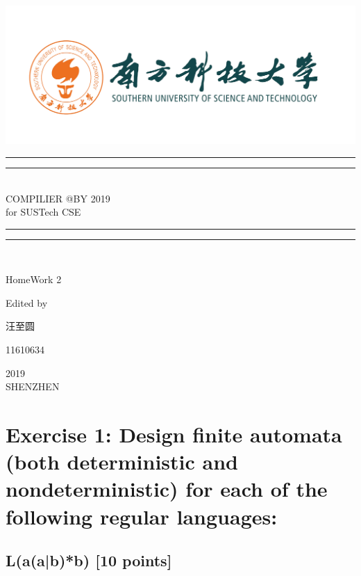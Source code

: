 \documentclass{article}
\begin{document}
 
    \begin{titlepage}       %
        \centering
        \includegraphics[width=\textwidth]{../SUSTC_LOGO.png}
        \rule{\textwidth}{1.6pt}\vspace*{-\baselineskip}\vspace*{2pt}
        \rule{\textwidth}{0.4pt}\\[\baselineskip]
        {\LARGE COMPILIER @BY 2019\\[\baselineskip]\small for SUSTech CSE}
        \\[0.2\baselineskip]
        \rule{\textwidth}{0.4pt}\vspace*{-\baselineskip}\vspace{3.2pt}
        \rule{\textwidth}{1.6pt}\\[\baselineskip]
        \scshape
        \vspace*{\baselineskip}
        {\Large HomeWork 2\par }
        Edited by \\[\baselineskip] {汪至圆\par}
        {\Large 11610634\par }
        \vfill
        {\scshape 2019} \\{\large SHENZHEN}\par
    \end{titlepage}
    \section{Exercise 1: Design finite automata (both deterministic and nondeterministic) for each of the following regular languages:}
        \subsection{ L(a(a|b)*b) [10 points]}
\end{document}
